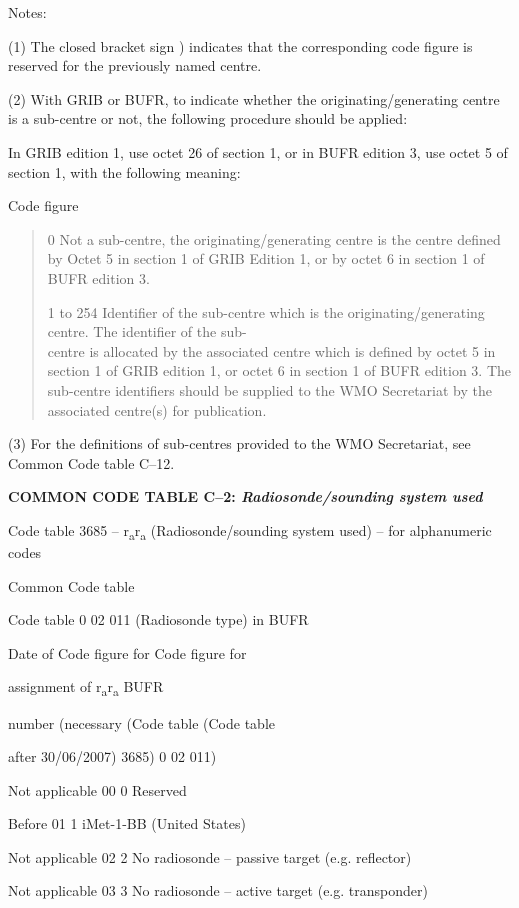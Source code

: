 Notes:

(1) The closed bracket sign ) indicates that the corresponding code figure is reserved for the previously named centre.

(2) With GRIB or BUFR, to indicate whether the originating/generating centre is a sub-centre or not, the following procedure should be applied:

In GRIB edition 1, use octet 26 of section 1, or in BUFR edition 3, use octet 5 of section 1, with the following meaning:

Code figure

\begin{quote}
0 Not a sub-centre, the originating/generating centre is the centre defined by Octet 5 in section 1 of GRIB Edition 1, or by octet 6 in section 1 of BUFR edition 3.

1 to 254 Identifier of the sub-centre which is the originating/generating centre. The identifier of the sub-\\
centre is allocated by the associated centre which is defined by octet 5 in section 1 of GRIB edition 1, or octet 6 in section 1 of BUFR edition 3. The sub-centre identifiers should be supplied to the WMO Secretariat by the associated centre(s) for publication.
\end{quote}

(3) For the definitions of sub-centres provided to the WMO Secretariat, see Common Code table C--12.

\textbf{COMMON CODE TABLE C--2: \emph{Radiosonde/sounding system used}}

Code table 3685 -- r\textsubscript{a}r\textsubscript{a} (Radiosonde/sounding system used) -- for alphanumeric codes

Common Code table

Code table 0 02 011 (Radiosonde type) in BUFR

Date of Code figure for Code figure for

assignment of r\textsubscript{a}r\textsubscript{a} BUFR

number (necessary (Code table (Code table

after 30/06/2007) 3685) 0 02 011)

Not applicable 00 0 Reserved

Before 01 1 iMet-1-BB (United States)

Not applicable 02 2 No radiosonde -- passive target (e.g. reflector)

Not applicable 03 3 No radiosonde -- active target (e.g. transponder)

